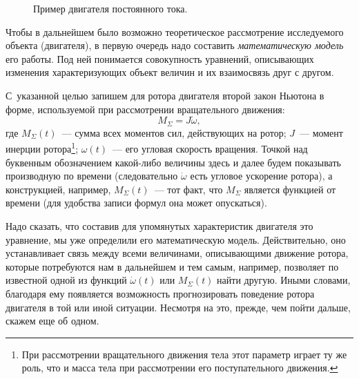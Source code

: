\documentclass[12pt,a4paper,openany]{extarticle}
\begin{document}
\begin{figure}[h]
	\begin{minipage}[h]{0.44\linewidth}
	\end{minipage}
	\hfill
	\begin{minipage}[h]{0.55\linewidth}
	\end{minipage}
	\caption{Пример двигателя постоянного тока.}
	\label{elmotor}
\end{figure}

Чтобы в дальнейшем было возможно теоретическое рассмотрение исследуемого объекта (двигателя), в первую очередь надо составить \textit{математическую модель} его работы.
Под ней понимается совокупность уравнений, описывающих изменения характеризующих объект величин и их взаимосвязь друг с другом.

С~указанной целью запишем для ротора двигателя второй закон Ньютона в форме, используемой при рассмотрении вращательного движения:
\begin{equation}\label{New's_eq}
	M_\varSigma = J\dot{\omega},
\end{equation}
где $M_\varSigma(t)$~--- сумма всех моментов сил, действующих на ротор; $J$~--- момент инерции ротора\footnote{При рассмотрении вращательного движения тела этот параметр играет ту же роль, что и масса тела при рассмотрении его поступательного движения.}; $\omega(t)$~--- его угловая скорость вращения.
Точкой над буквенным обозначением какой-либо величины здесь и далее будем показывать производную по времени (следовательно $\dot{\omega}$ есть угловое ускорение ротора), а конструкцией, например, $M_\varSigma(t)$~--- тот факт, что $M_\varSigma$ является функцией от времени (для удобства записи формул она может опускаться).

Надо сказать, что составив для упомянутых характеристик двигателя это уравнение, мы уже определили его математическую модель.
Действительно, оно устанавливает связь между всеми величинами, описывающими движение ротора, которые потребуются нам в дальнейшем и тем самым, например, позволяет по известной одной из функций $\dot\omega(t)$ или $M_\varSigma(t)$ найти другую.
Иными словами, благодаря ему появляется возможность прогнозировать поведение ротора двигателя в той или иной ситуации.
Несмотря на это, прежде, чем пойти дальше, скажем еще об одном.
\end{document}
